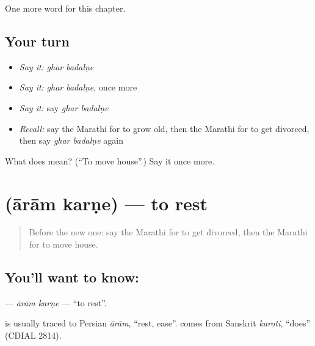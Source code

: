 \begin{grammarlens}[title={What you've built}]
One more word for this chapter.
\end{grammarlens}

\subsection*{Your turn}
\begin{itemize}
\raggedright
  \item \emph{Say it:} \emph{ghar badalṇe}
  \item \emph{Say it:} \emph{ghar badalṇe}, once more
  \item \emph{Say it:} say \emph{ghar badalṇe}
  \item \emph{Recall:} say the Marathi for to grow old, then the Marathi for to get divorced, then say \emph{ghar badalṇe} again
\end{itemize}

\begin{tcolorbox}[breakable,colback=teal!4,colframe=teal!35!black,title={Before you move on}]
What does   mean? (\textquotedblleft{}To move house\textquotedblright{}.) Say it once more.
\end{tcolorbox}
\section[\texorpdfstring{\mr{आराम} \mr{करणे} (ārām karṇe)}{आराम करणे (ārām karṇe)}]{  (ārām karṇe) — to rest}

\label{lesson:MR-C224-aram-karne}



\begin{quote}
Before the new one: say the Marathi for to get divorced, then the Marathi for to move house.
\end{quote}

\subsection*{You'll want to know:  }
\textbf{ } — \emph{ārām karṇe} — \textquotedblleft{}to rest\textquotedblright{}.

\begin{cousinweb}
\textbf{} is usually traced to Persian \emph{ārām}, \textquotedblleft{}rest, ease\textquotedblright{}. \textbf{} comes from Sanskrit \emph{karoti}, \textquotedblleft{}does\textquotedblright{} (CDIAL 2814).
\end{cousinweb}

